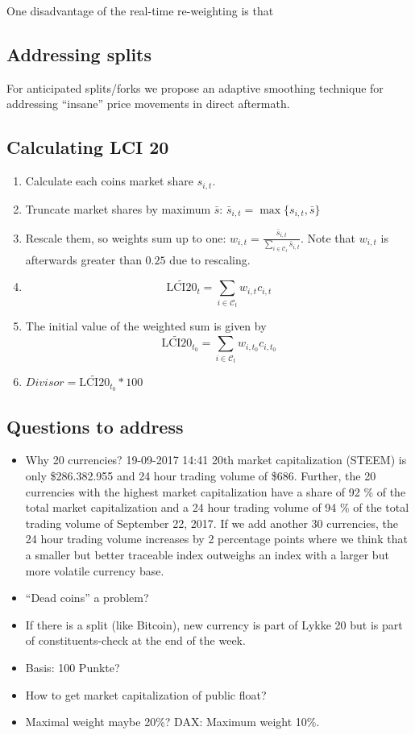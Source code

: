 \documentclass[11pt]{article}
\begin{document}
One disadvantage of the real-time re-weighting is that 

\subsection{Addressing splits}\label{subseq:split_smoothing}
For anticipated splits/forks we propose an adaptive smoothing technique for addressing ``insane'' price movements in direct aftermath. 

\subsection{Calculating LCI 20}

\begin{enumerate}
  \item Calculate each coins market share $s_{i,t}$.
  \item Truncate market shares by maximum $\bar s$: $\bar s_{i,t} = \max\{ s_{i,t}, \bar s\}$
  \item Rescale them, so weights sum up to one: $w_{i,t} = \frac{\bar s_{i,t}}{\sum_{i \in \mathcal{C}_t} \bar s_{i,t}}$. Note that $w_{i,t}$ is afterwards greater than $0.25$ due to rescaling.
  \item $$\widetilde{\text{LCI20}}_t = \sum_{i \in \mathcal{C}_{t}} w_{i,t} c_{i,t}$$
  \item The initial value of the weighted sum is given by $$\widetilde{\text{LCI20}}_{t_0} = \sum_{i \in \mathcal{C}_{t}} w_{i,t_0} c_{i,t_0}$$
  \item $Divisor = \widetilde{\text{LCI20}}_{t_0} * 100$
\end{enumerate}

\subsection{Questions to address}
\begin{itemize}
  \item Why 20 currencies? 19-09-2017 14:41 20th market capitalization (STEEM) is only \$286.382.955 and 24 hour trading volume of \$686. Further, the 20 currencies with the highest market capitalization have a share of 92 \% of the total market capitalization and a 24 hour trading volume of 94 \% of the total trading volume of September 22, 2017. If we add another 30 currencies, the 24 hour trading volume increases by 2 percentage points where we think that a smaller but better traceable index outweighs an index with a larger but more volatile currency base.
  \item ``Dead coins'' a problem?
  \item If there is a split (like Bitcoin), new currency is part of Lykke 20 but is part of constituents-check at the end of the week.
  \item Basis: 100 Punkte?
  \item How to get market capitalization of public float?
  \item Maximal weight maybe 20\%? DAX: Maximum weight 10\%.
\end{itemize}
\end{document}

